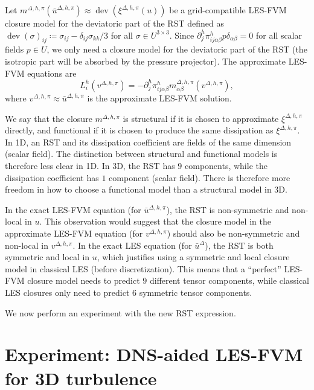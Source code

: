 \documentclass[preprint,twocolumn,5p]{elsarticle}
\begin{document}
Let
$m^{\Delta, h, \pi}(\bar{u}^{\Delta, h, \pi}) \approx
\operatorname{dev} \left( \xi^{\Delta, h, \pi}(u) \right)$
be a grid-compatible LES-FVM closure model for the deviatoric part of the RST
defined as
$\operatorname{dev}(\sigma)_{i j} \coloneq
\sigma_{i j} - \delta_{i j} \sigma_{k k} / 3$
for all $\sigma \in U^{3 \times 3}$.
Since $\partial^h_j \pi^h_{i j \alpha \beta} p \delta_{\alpha \beta} = 0$
for all scalar fields $p \in U$,
we only need a closure model for the deviatoric part of the RST
(the isotropic part will be absorbed by the pressure projector).
The approximate LES-FVM equations are
\begin{equation} \label{eq:ns-les-fvm-closed}
    L^h_i(v^{\Delta, h, \pi}) = - \partial^h_j \pi^h_{i j \alpha \beta} m^{\Delta, h, \pi}_{\alpha \beta}(v^{\Delta, h, \pi}),
\end{equation}
where $v^{\Delta, h, \pi} \approx \bar{u}^{\Delta, h, \pi}$ is the approximate
LES-FVM solution.

We say that the closure $m^{\Delta, h, \pi}$ is structural if it is chosen to
approximate
$\xi^{\Delta, h, \pi}$ directly, and functional if it is chosen to produce the
same dissipation as $\xi^{\Delta, h, \pi}$.
In 1D, an RST and its dissipation coefficient are fields of the same dimension
(scalar field). The distinction between structural and functional models is
therefore less clear in 1D.
In 3D, the RST has $9$ components, while the dissipation coefficient has
$1$ component (scalar field). There is therefore more freedom in how to choose
a functional model than a structural model in 3D.

In the exact LES-FVM equation (for $\bar{u}^{\Delta, h, \pi}$),
the RST is non-symmetric and non-local in $u$.
This observation would suggest that the closure model in the approximate
LES-FVM equation (for $v^{\Delta, h, \pi}$)
should also be non-symmetric and non-local in $v^{\Delta, h, \pi}$.
In the exact LES equation (for $\bar{u}^\Delta$), the RST is both symmetric and
local in $u$, which justifies using a symmetric and local closure model
in classical LES (before discretization).
This means that a ``perfect'' LES-FVM closure model needs to predict $9$
different tensor components, while classical LES closures only need to predict
$6$ symmetric tensor components.



We now perform an experiment with the new RST expression.

\section{Experiment: DNS-aided LES-FVM for 3D turbulence}
\label{sec:navier-stokes-experiments}
\end{document}
